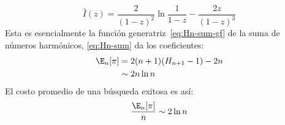   \begin{equation}
    \label{eq:BST-I-explicit}
    \widehat{I}(z)
      = \frac{2}{(1 - z)^2} \ln \frac{1}{1 - z} - \frac{2 z}{(1 - z)^3}
  \end{equation}
  Esta es esencialmente la función generatriz~\eqref{eq:Hn-sum-gf}
  de la suma de números harmónicos,
  \eqref{eq:Hn-sum} da los coeficientes:
  \begin{align}
    \E_n[\pi]
      &=    2 (n + 1) (H_{n + 1} - 1) - 2 n
	      \label{eq:BST-En-pi-explicit} \\
      &\sim 2 n \ln n
	      \label{eq:BST-En-pi-asy}
  \end{align}
  El costo promedio de una búsqueda exitosa es así:%
  \begin{equation}
    \label{eq:BST-success}
    \frac{\E_n[\pi]}{n}
      \sim 2 \ln n
  \end{equation}

